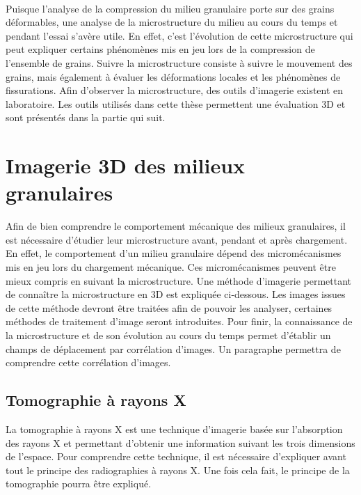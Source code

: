 	\paragraph{}
	Puisque l'analyse de la compression du milieu granulaire porte sur des grains déformables, une analyse de la microstructure du milieu au cours du temps et pendant l'essai s'avère utile. En effet, c'est l'évolution de cette microstructure qui peut expliquer certains phénomènes mis en jeu lors de la compression de l'ensemble de grains. Suivre la microstructure consiste à suivre le mouvement des grains, mais également à évaluer les déformations locales et les phénomènes de fissurations. Afin d'observer la microstructure, des outils d'imagerie existent en laboratoire. Les outils utilisés dans cette thèse permettent une évaluation 3D et sont présentés dans la partie qui suit.
	
\section{Imagerie 3D des milieux granulaires}
	Afin de bien comprendre le comportement mécanique des milieux granulaires, il est nécessaire d'étudier leur microstructure avant, pendant et après chargement. En effet, le comportement d'un milieu granulaire dépend des micromécanismes mis en jeu lors du chargement mécanique. Ces micromécanismes peuvent être mieux compris en suivant la microstructure. Une méthode d'imagerie permettant de connaître la microstructure en 3D est expliquée ci-dessous. Les images issues de cette méthode devront être traitées afin de pouvoir les analyser, certaines méthodes de traitement d'image seront introduites. Pour finir, la connaissance de la microstructure et de son évolution au cours du temps permet d'établir un champs de déplacement par corrélation d'images. Un paragraphe permettra de comprendre cette corrélation d'images.
	\subsection{Tomographie à rayons X}\label{para03:tomo}
		La tomographie à rayons X est une technique d'imagerie basée sur l'absorption des rayons X et permettant d'obtenir une information suivant les trois dimensions de l'espace. Pour comprendre cette technique, il est nécessaire d'expliquer avant tout le principe des radiographies à rayons X. Une fois cela fait, le principe de la tomographie pourra être expliqué.
